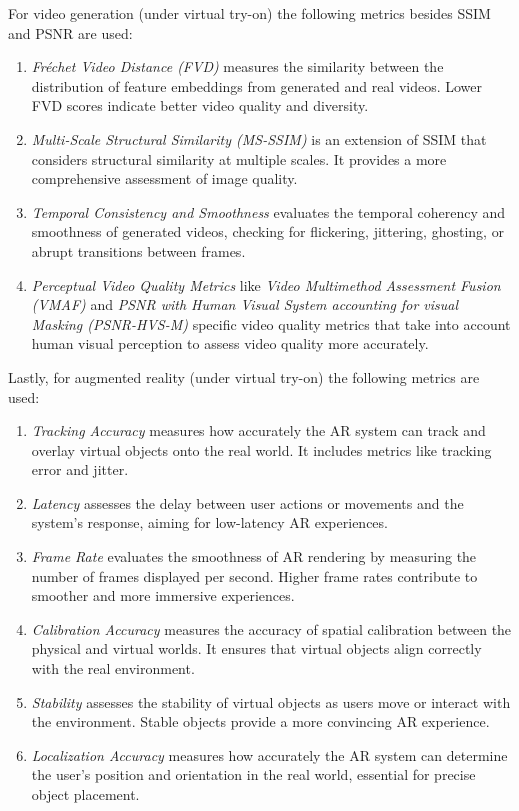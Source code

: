 			For video generation (under virtual try-on) the following metrics besides SSIM and PSNR are used:

			\begin{enumerate}
				\item \textit{Fréchet Video Distance (FVD)} measures the similarity between the distribution of feature embeddings from generated and real videos. Lower FVD scores indicate better video quality and diversity.
				\item \textit{Multi-Scale Structural Similarity (MS-SSIM)} is an extension of SSIM that considers structural similarity at multiple scales. It provides a more comprehensive assessment of image quality.
				\item \textit{Temporal Consistency and Smoothness} evaluates the temporal coherency and smoothness of generated videos, checking for flickering, jittering, ghosting, or abrupt transitions between frames.
				\item \textit{Perceptual Video Quality Metrics} like \textit{Video Multimethod Assessment Fusion (VMAF)} and \textit{PSNR with Human Visual System accounting for visual Masking (PSNR-HVS-M)} specific video quality metrics that take into account human visual perception to assess video quality more accurately.
			\end{enumerate}

			Lastly, for augmented reality (under virtual try-on) the following metrics are used:

			\begin{enumerate}
				\item \textit{Tracking Accuracy} measures how accurately the AR system can track and overlay virtual objects onto the real world. It includes metrics like tracking error and jitter.
				\item \textit{Latency} assesses the delay between user actions or movements and the system's response, aiming for low-latency AR experiences.
				\item \textit{Frame Rate} evaluates the smoothness of AR rendering by measuring the number of frames displayed per second. Higher frame rates contribute to smoother and more immersive experiences.
				\item \textit{Calibration Accuracy} measures the accuracy of spatial calibration between the physical and virtual worlds. It ensures that virtual objects align correctly with the real environment.
				\item \textit{Stability} assesses the stability of virtual objects as users move or interact with the environment. Stable objects provide a more convincing AR experience.
				\item \textit{Localization Accuracy} measures how accurately the AR system can determine the user's position and orientation in the real world, essential for precise object placement.
			\end{enumerate}

